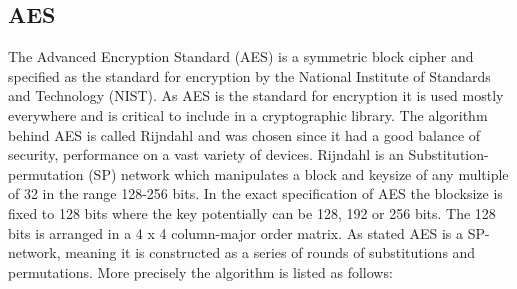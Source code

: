\documentclass[a4paper]{article}
\begin{document}
\subsection{AES}
\label{AESalg}
The Advanced Encryption Standard (AES) is a symmetric block cipher and specified as the standard for encryption by the National Institute of Standards and Technology (NIST). As AES is the standard for encryption it is used mostly everywhere and is critical to include in a cryptographic library. The algorithm behind AES is called Rijndahl and was chosen since it had a good balance of security, performance on a vast variety of devices\cite{AESofficial}. Rijndahl is an Substitution-permutation (SP) network which manipulates a block and keysize of any multiple of 32 in the range 128-256 bits. In the exact specification of AES the blocksize is fixed to 128 bits where the key potentially can be 128, 192 or 256 bits. The 128 bits is arranged in a 4 x 4 column-major order matrix. As stated AES is a SP-network, meaning it is constructed as a series of rounds of substitutions and permutations. More precisely the algorithm is listed as follows:
\end{document}
